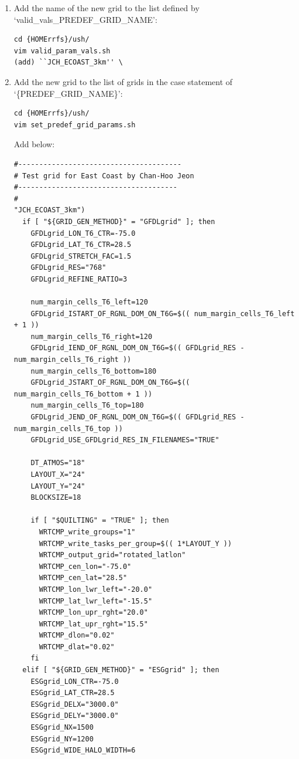 \documentclass[11pt,fleqn]{report}              %
\begin{document}
\begin{enumerate}
\begin{itemize}
\end{itemize}

\item Add the name of the new grid to the list defined by `valid\_vals\_PREDEF\_GRID\_NAME':
\lstset{language=bash}   
\begin{lstlisting}[frame=trBL]
cd {HOMErrfs}/ush/
vim valid_param_vals.sh
(add) ``JCH_ECOAST_3km'' \
\end{lstlisting}

\item Add the new grid to the list of grids in the case statement of `\{PREDEF\_GRID\_NAME\}':
\lstset{language=bash}   
\begin{lstlisting}[frame=trBL]
cd {HOMErrfs}/ush/
vim set_predef_grid_params.sh
\end{lstlisting}

Add below:
\lstset{language=bash}   
\begin{lstlisting}[frame=trBL, basicstyle=\tiny]
#---------------------------------------
# Test grid for East Coast by Chan-Hoo Jeon
#--------------------------------------
#
"JCH_ECOAST_3km")
  if [ "${GRID_GEN_METHOD}" = "GFDLgrid" ]; then
    GFDLgrid_LON_T6_CTR=-75.0
    GFDLgrid_LAT_T6_CTR=28.5
    GFDLgrid_STRETCH_FAC=1.5
    GFDLgrid_RES="768"
    GFDLgrid_REFINE_RATIO=3
  
    num_margin_cells_T6_left=120
    GFDLgrid_ISTART_OF_RGNL_DOM_ON_T6G=$(( num_margin_cells_T6_left + 1 ))
    num_margin_cells_T6_right=120
    GFDLgrid_IEND_OF_RGNL_DOM_ON_T6G=$(( GFDLgrid_RES - num_margin_cells_T6_right ))
    num_margin_cells_T6_bottom=180
    GFDLgrid_JSTART_OF_RGNL_DOM_ON_T6G=$(( num_margin_cells_T6_bottom + 1 ))
    num_margin_cells_T6_top=180
    GFDLgrid_JEND_OF_RGNL_DOM_ON_T6G=$(( GFDLgrid_RES - num_margin_cells_T6_top ))
    GFDLgrid_USE_GFDLgrid_RES_IN_FILENAMES="TRUE"

    DT_ATMOS="18"
    LAYOUT_X="24"
    LAYOUT_Y="24"
    BLOCKSIZE=18

    if [ "$QUILTING" = "TRUE" ]; then
      WRTCMP_write_groups="1"
      WRTCMP_write_tasks_per_group=$(( 1*LAYOUT_Y ))
      WRTCMP_output_grid="rotated_latlon"
      WRTCMP_cen_lon="-75.0"
      WRTCMP_cen_lat="28.5"
      WRTCMP_lon_lwr_left="-20.0"
      WRTCMP_lat_lwr_left="-15.5"
      WRTCMP_lon_upr_rght="20.0"
      WRTCMP_lat_upr_rght="15.5"
      WRTCMP_dlon="0.02"
      WRTCMP_dlat="0.02"
    fi
  elif [ "${GRID_GEN_METHOD}" = "ESGgrid" ]; then
    ESGgrid_LON_CTR=-75.0
    ESGgrid_LAT_CTR=28.5
    ESGgrid_DELX="3000.0"
    ESGgrid_DELY="3000.0"
    ESGgrid_NX=1500
    ESGgrid_NY=1200
    ESGgrid_WIDE_HALO_WIDTH=6
    

\end{lstlisting}
\end{enumerate}
\end{document}
